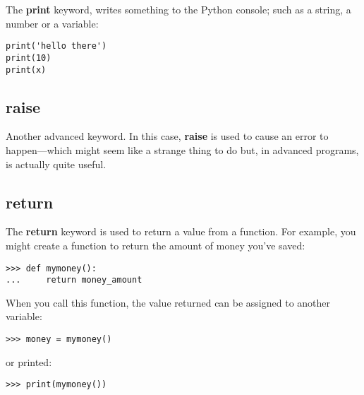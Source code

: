 The \textbf{print} keyword, writes something to the Python console; such as a string, a number or a variable:

\begin{Verbatim}[frame=single]
print('hello there')
print(10)
print(x)
\end{Verbatim}

\subsection*{raise}

Another advanced keyword.  In this case, \textbf{raise} is used to cause an error to happen---which might seem like a strange thing to do but, in advanced programs, is actually quite useful.

\subsection*{return}

The \textbf{return} keyword is used to return a value from a function.  For example, you might create a function to return the amount of money you've saved:

\begin{Verbatim}[frame=single]
>>> def mymoney():
...     return money_amount
\end{Verbatim}

\noindent
When you call this function, the value returned can be assigned to another variable:

\begin{Verbatim}[frame=single]
>>> money = mymoney()
\end{Verbatim}

\noindent
or printed:

\begin{Verbatim}[frame=single]
>>> print(mymoney())
\end{Verbatim}

